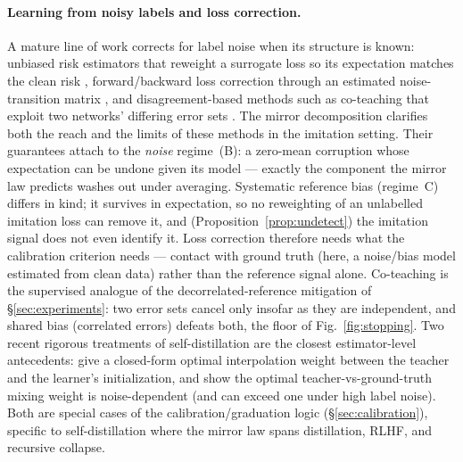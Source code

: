 \documentclass[10pt]{article} %
\theoremstyle{plain}
\theoremstyle{remark}
\begin{document}
\paragraph{Learning from noisy labels and loss correction.} A mature line of work corrects for label noise when its structure is known: unbiased risk estimators that reweight a surrogate loss so its expectation matches the clean risk \citep{natarajan2013}, forward/backward loss correction through an estimated noise-transition matrix \citep{patrini2017}, and disagreement-based methods such as co-teaching that exploit two networks' differing error sets \citep{han2018}. The mirror decomposition clarifies both the reach and the limits of these methods in the imitation setting. Their guarantees attach to the \emph{noise} regime~(B): a zero-mean corruption whose expectation can be undone given its model --- exactly the component the mirror law predicts washes out under averaging. Systematic reference bias (regime~C) differs in kind; it survives in expectation, so no reweighting of an unlabelled imitation loss can remove it, and (Proposition~\ref{prop:undetect}) the imitation signal does not even identify it. Loss correction therefore needs what the calibration criterion needs --- contact with ground truth (here, a noise/bias model estimated from clean data) rather than the reference signal alone. Co-teaching is the supervised analogue of the decorrelated-reference mitigation of \S\ref{sec:experiments}: two error sets cancel only insofar as they are independent, and shared bias (correlated errors) defeats both, the floor of Fig.~\ref{fig:stopping}. Two recent rigorous treatments of self-distillation are the closest estimator-level antecedents: \citet{borup2021} give a closed-form optimal interpolation weight between the teacher and the learner's initialization, and \citet{das2023} show the optimal teacher-vs-ground-truth mixing weight is noise-dependent (and can exceed one under high label noise). Both are special cases of the calibration/graduation logic (\S\ref{sec:calibration}), specific to self-distillation where the mirror law spans distillation, RLHF, and recursive collapse.
\end{document}
